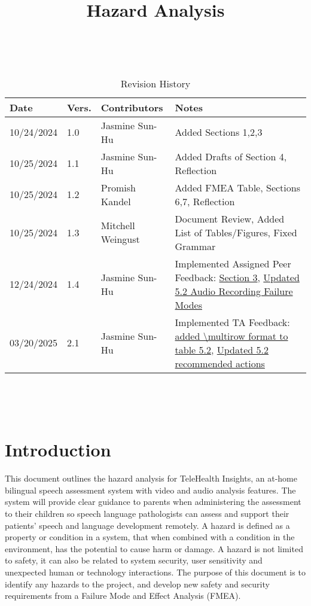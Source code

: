 \documentclass{article}
\title{Hazard Analysis\\\progname}
\author{\authname}
\date{}
\begin{document}
\maketitle
\thispagestyle{empty}

~\newpage


\begin{table}[hp]
\caption{Revision History} \label{TblRevisionHistory}
\begin{tabularx}{\textwidth}{p{1.5cm}p{1cm}p{3.5cm}X}
\toprule {\textbf{Date}} & {\textbf{Vers.}} & {\textbf{Contributors}} & {\textbf{Notes}}\\
\midrule
10/24/2024 & 1.0 & Jasmine Sun-Hu & Added Sections 1,2,3\\
10/25/2024 & 1.1 & Jasmine Sun-Hu & Added Drafts of Section 4, Reflection\\
10/25/2024 & 1.2 & Promish Kandel & Added FMEA Table, Sections 6,7, Reflection\\
10/25/2024 & 1.3 & Mitchell Weingust & Document Review, Added List of Tables/Figures, Fixed Grammar\\
12/24/2024 & 1.4 & Jasmine Sun-Hu & Implemented Assigned Peer Feedback: \href{https://github.com/parishanizam/TeleHealth/issues/131}{Section 3}, \href{https://github.com/parishanizam/TeleHealth/issues/157}{Updated 5.2 Audio Recording Failure Modes}\\
03/20/2025 & 2.1 & Jasmine Sun-Hu & Implemented TA Feedback: \href{https://github.com/parishanizam/TeleHealth/issues/233}{added \textbackslash multirow format to table 5.2}, \href{https://github.com/parishanizam/TeleHealth/issues/234}{Updated 5.2 recommended actions}\\
\bottomrule
\end{tabularx}
\end{table}

~\newpage

\tableofcontents
\listoffigures
\listoftables

~\newpage


\section{Introduction}

\hspace{1.5em} This document outlines the hazard analysis for TeleHealth Insights, an at-home bilingual speech 
assessment system with video and audio analysis features. The system will provide clear guidance to
parents when administering the assessment to their children so speech language pathologists can assess and support
their patients' speech and language development remotely. A hazard is defined as a 
property or condition in a system, that when combined with a condition in the environment, has the potential to cause harm or 
damage. A hazard is not limited to safety, it can also be related to system security, user sensitivity and 
unexpected human or technology interactions. The purpose of this document is to identify any hazards to the project, and 
develop new safety and security requirements from a Failure Mode and Effect Analysis (FMEA).
\end{document}
